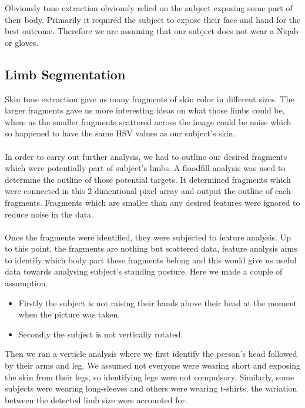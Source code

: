 \documentclass[10pt,journal,compsoc]{IEEEtran}
\begin{document}
Obviously tone extraction obviously relied on the subject exposing some part of their body. Primarily it required the subject to expose their face and hand for the best outcome. Therefore we are assuming that our subject does not wear a Niqab or gloves. 


\subsection{Limb Segmentation}
Skin tone extraction gave us many fragments of skin color in different sizes. The larger fragments gave us more interesting ideas on what those limbs could be, where as the smaller fragments scattered across the image could be noise which so happened to have the same HSV values as our subject's skin.
\\ \\
In order to carry out further analysis, we had to outline our desired fragments which were potentially part of subject's limbs. A floodfill analysis was used to determine the outline of those potential targets. It determined fragments which were connected in this 2 dimentional pixel array and output the outline of each fragments. Fragments which are smaller than any desired features were ignored to reduce noise in the data. 
\\ \\
Once the fragments were identified, they were subjected to feature analysis. Up to this point, the fragments are nothing but scattered data, feature analysis aims to identify which body part these fragments belong and this would give us useful data towards analysing subject's standing posture. Here we made a couple of assumption. 
\begin{itemize}
    \item Firstly the subject is not raising their hands above their head at the moment when the picture was taken. 
    \item Secondly the subject is not vertically rotated. 
\end{itemize}
Then we ran a verticle analysis where we first identify the person's head followed by their arms and leg. We assumed not everyone were wearing short and exposing the skin from their legs, so identifying legs were not compulsory. Similarly, some subjects were wearing long-sleeves and others were wearing t-shirts, the variation between the detected limb size were accounted for.
\end{document}
